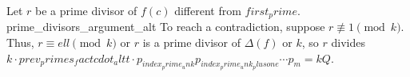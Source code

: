 Let $r$ be a prime divisor of $f(c)$ different from ${first_prime}$. {prime_divisors_argument_alt} To reach a contradiction, suppose $r\not\equiv 1\pmod{{k}}$. Thus, $r\equiv {ell}\pmod{{k}}$ or $r$ is a prime divisor of $\Delta(f)$ or ${k}$, so $r$ divides ${k}\cdot{prev_primes_fact}{cdot_alt} t\cdot p_{{index_prime_unk}}p_{{index_prime_unk_plusone}}\cdots p_m={k}Q$.